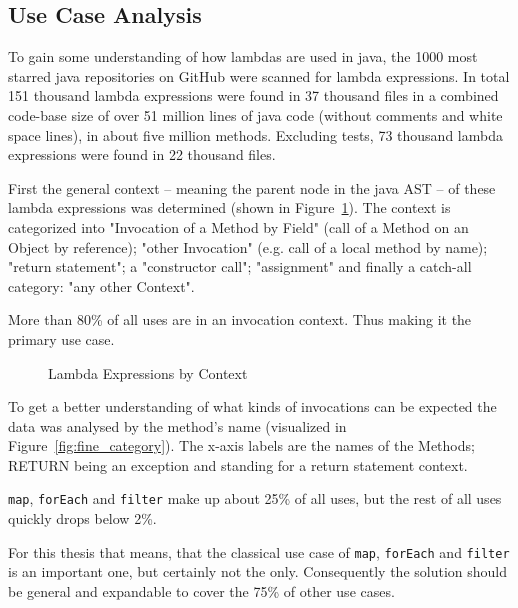 \documentclass[11pt]{article}
\begin{document}
\newpage
\begin{appendices}

\section{Use Case Analysis}

To gain some understanding of how lambdas are used in java, the 1000 most starred java repositories on GitHub were scanned for lambda expressions. In total 151 thousand lambda expressions were found in 37 thousand files in a combined code-base size of over 51 million lines of java code (without comments and white space lines), in about five million methods. Excluding tests, 73 thousand lambda expressions were found in 22 thousand files. 


First the general context -- meaning the parent node in the java AST -- of these lambda expressions was determined (shown in Figure~\ref{fig:coarse_category}). The context is categorized into "Invocation of a Method by Field" (call of a Method on an Object by reference); "other Invocation" (e.g. call of a local method by name); "return statement"; a "constructor call"; "assignment" and finally a catch-all category: "any other Context".

More than 80\% of all uses are in an invocation context. Thus making it the primary use case.


\begin{figure}[H]
	\caption{Lambda Expressions by Context}
	\label{fig:coarse_category}
\end{figure}

To get a better understanding of what kinds of invocations can be expected the data was analysed by the method's name (visualized in Figure~\ref{fig:fine_category}). The x-axis labels are the names of the Methods; RETURN being an exception and standing for a return statement context.

\texttt{map}, \texttt{forEach} and \texttt{filter} make up about 25\% of all uses, but the rest of all uses quickly drops below 2\%.

For this thesis that means, that the classical use case of \texttt{map}, \texttt{forEach} and \texttt{filter} is an important one, but certainly not the only. Consequently the solution should be general and expandable to cover the 75\% of other use cases.


\end{appendices}
\end{document}
